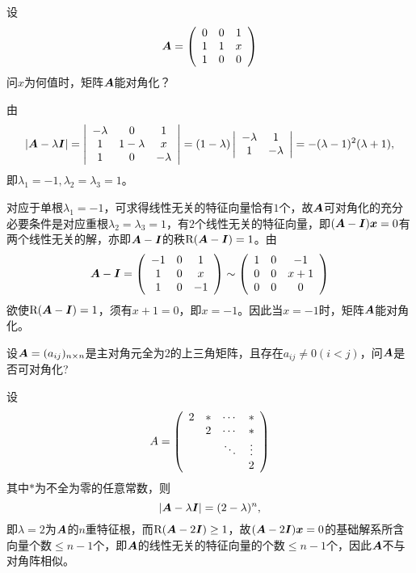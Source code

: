\begin{li}
  设
  $$
  \boldsymbol{A}=\left(
    \begin{array}{ccc}
      0&0&1\\
      1&1&x\\
      1&0&0
    \end{array}
  \right)
  $$
  问$x$为何值时，矩阵$\boldsymbol{A}$能对角化？
\end{li}
\begin{jie}
  由
  $$
  |\boldsymbol{A}-\lambda\boldsymbol{I}|=
  \left|
    \begin{array}{ccc}
      -\lambda&0&1\\
      1&1-\lambda&x\\
      1&0&-\lambda
    \end{array}
  \right|
  =(1-\lambda)
  \left|
    \begin{array}{ccc}
      -\lambda&1\\
      1&-\lambda
    \end{array}
  \right|=-(\lambda-1)^2(\lambda+1),
  $$
  即$\lambda_1=-1,\lambda_2=\lambda_3=1$。

  对应于单根$\lambda_1=-1$，可求得线性无关的特征向量恰有$1$个，故$\boldsymbol{A}$可对角化的充分必要条件是对应重根$\lambda_2=\lambda_3=1$，有$2$个线性无关的特征向量，即$(\boldsymbol{A}-\boldsymbol{I}){\boldsymbol{x}}=0$有两个线性无关的解，亦即$\boldsymbol{A}-\boldsymbol{I}$的秩$\mathrm{R}(\boldsymbol{A}-\boldsymbol{I})=1$。由
  $$
  \boldsymbol{A}-\boldsymbol{I}=\left(
    \begin{array}{ccc}
      -1&0&1\\
      1&0&x\\
      1&0&-1
    \end{array}
  \right)\sim \left(
    \begin{array}{ccc}
      1&0&-1\\
      0&0&x+1\\
      0&0&0
    \end{array}
  \right)
  $$
  欲使$\mathrm{R}(\boldsymbol{A}-\boldsymbol{I})=1$，须有$x+1=0$，即$x=-1$。因此当$x=-1$时，矩阵$\boldsymbol{A}$能对角化。
\end{jie}

\begin{li}
  设$\boldsymbol{A}=(a_{ij})_{n\times n}$是主对角元全为$2$的上三角矩阵，且存在$a_{ij}\ne 0(i<j)$，问$\boldsymbol{A}$是否可对角化?
\end{li}

\begin{jie}
  设
  $$
  A=\left(
    \begin{array}{cccc}
      2&*&\cdots&*\\
       &2&\cdots&*\\
       &&\ddots&\vdots\\
       &&&2
    \end{array}
  \right)
  $$
  其中$*$为不全为零的任意常数，则
  $$
  |\boldsymbol{A}-\lambda\boldsymbol{I}|=(2-\lambda)^n,
  $$
  即$\lambda=2$为$\boldsymbol{A}$的$n$重特征根，而$\mathrm{R}(\boldsymbol{A}-2\boldsymbol{I})\ge 1$，故$(\boldsymbol{A}-2\boldsymbol{I}){\boldsymbol{x}}=0$的基础解系所含向量个数$\le n-1$个，即$\boldsymbol{A}$的线性无关的特征向量的个数$\le n-1$个，因此$\boldsymbol{A}$不与对角阵相似。
\end{jie}
